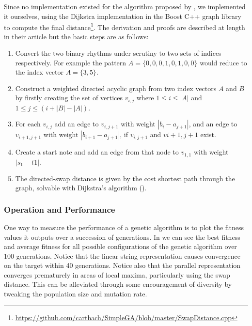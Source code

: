 Since no implementation existed for the algorithm proposed by \cite{Colannino2005}, we implemented it ourselves, using the Dijkstra implementation in the Boost C++ graph library \citep{Siek2002} to compute the final distance\footnote{\url{https://github.com/carthach/SimpleGA/blob/master/SwapDistance.cpp}}. The derivation and proofs are described at length in their article \citep{Colannino2005} but the basic steps are as follows:

\begin{enumerate}
  \item Convert the two binary rhythms under scrutiny to two sets of indices respectively. For example the pattern $A = \{0, 0, 0, 1, 0, 1, 0, 0\}$ would reduce to the index vector $A = \{3, 5\}$.
  \item Construct a weighted directed acyclic graph from two index vectors $A$ and $B$ by firstly creating the set of vertices $v_{i,j}$ where $1 \leq i \leq |A|$ and $1 \leq j \leq (i+|B|-|A|)$.
  \item For each $v_{i,j}$ add an edge to $v_{i, j+1}$ with weight $|b_{i}-a_{j+1}|$, and an edge to $v_{i+1, j+1}$ with weight $|b_{i+1}-a_{j+1}|$, if $v_{i, j+1}$ and $v{i+1, j+1}$ exist.
  \item Create a start note and add an edge from that node to $v_{1,1}$ with weight $|s_{1}-t{1}|$.
  \item The directed-swap distance is given by the cost shortest path through the graph, solvable with Dijkstra's algorithm ().
\end{enumerate}

\subsubsection{Operation and Performance}

One way to measure the performance of a genetic algorithm is to plot the fitness values it outputs over a succession of generations. In  we can see the best fitness and average fitness for all possible configurations of the genetic algorithm over 100 generations. Notice that the linear string representation causes convergence on the target within 40 generations. Notice also that the parallel representation converges prematurely in areas of local maxima, particularly using the swap distance. This can be alleviated through some encouragement of diversity by tweaking the population size and mutation rate.

